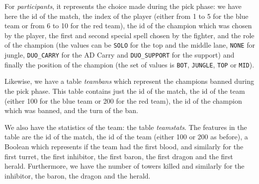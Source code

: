 \documentclass{article}
\begin{document}
For \emph{participants}, it represents the choice made during the pick phase: we have here the id of the match, the index of the player (either from 1 to 5 for the blue team or from 6 to 10 for the red team), the id of the champion which was chosen by the player, the first and second special spell chosen by the fighter, and the role of the champion (the values can be \texttt{SOLO} for the top and the middle lane, \texttt{NONE} for jungle, \texttt{DUO\_CARRY} for the AD Carry and \texttt{DUO\_SUPPORT} for the support) and finally the position of the champion (the set of values is \texttt{BOT}, \texttt{JUNGLE}, \texttt{TOP} or \texttt{MID}).

Likewise, we have a table \emph{teambans} which represent the champions banned during the pick phase. This table contains just the id of the match, the id of the team (either 100 for the blue team or 200 for the red team), the id of the champion which was banned, and the turn of the ban.

We also have the statistics of the team: the table \emph{teamstats}. The features in the table are the id of the match, the id of the team (either 100 or 200 as before), a Boolean which represents if the team had the first blood, and similarly for the first turret, the first inhibitor, the first baron, the first dragon and the first herald. Furthermore, we have the number of towers killed and similarly for the inhibitor, the baron, the dragon and the herald.
\end{document}
